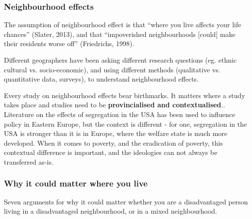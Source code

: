 \documentclass{article}
\begin{document}
\subsubsection{Neighbourhood effects}

The assumption of neighbourhood effect is that ``where you live affects your life chances'' (Slater, 2013), and that ``impoverished neighbourhoods $[$could$]$ make their residents worse off'' (Friedrichs, 1998).

Different geographers have been asking different research questions (eg. ethnic cultural vs. socio-economic), and using different methods (qualitative vs. quantitative data, surveys), to understand neighbourhood effects.

Every study on neighbourhood effects bear birthmarks. It matters where a study takes place and studies need to be \textbf{provincialised and contextualised}.. 
Literature on the effects of segregation in the USA has been used to influence policy in Eastern Europe, but the context is different - for one, segregation in the USA is stronger than it is in Europe, where the welfare state is much more developed. When it comes to poverty, and the eradication of poverty, this contextual difference is important, and the ideologies can not always be transferred as-is. 

\subsubsection{Why it could matter where you live}

Seven arguments for why it could matter whether you are a disadvantaged person living in a disadvantaged neighbourhood, or in a mixed neighbourhood.
\end{document}
